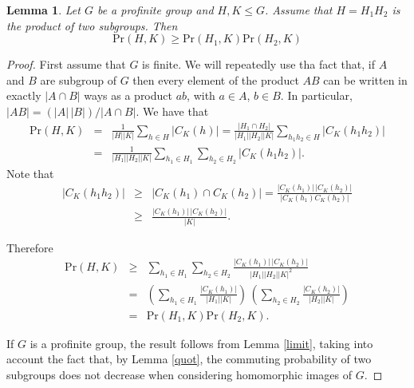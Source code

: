 \documentclass[12pt]{amsart}
\newtheorem{lemma}[theorem]{\bf Lemma}
\newcommand{\pr }{\mathrm{Pr} }
\begin{document}
\begin{lemma}\label{prod} 
Let $G$ be a profinite group and $H, K \le G$. Assume that $H=H_1H_2$ is the product of two subgroups. Then
\[\pr(H,K)\ge\pr(H_1,K)\pr(H_2,K)\]
\end{lemma}
\begin{proof} First assume that $G$ is finite. We will repeatedly use tha fact that, if $A$ and $B$ are subgroup of $G$ then every element of the product $AB$ %
can be written in exactly $|A\cap B|$ ways as a product $ab$, with $a\in A$, $b\in B$. In particular, $|AB|= (|A|\,|B|)/|A\cap B|$. 
We have that
\begin{eqnarray*}
\pr(H,K)
&=&
\frac{1}{|H||K|}
\sum_{h\in H} |C_K(h)|
 = %
\frac{|H_1\cap H_2|}{|H_1||H_2||K|}\sum_{h_1h_2\in H} |C_K(h_1h_2)|\\
&=&
\frac{1}{|H_1||H_2||K|}\sum_{h_1\in H_1}\sum_{h_2\in H_2}
|C_K(h_1h_2)|.
\end{eqnarray*}
 Note that 
 \begin{eqnarray*}
|C_K(h_1h_2)| &\ge& |C_K(h_1)\cap C_K(h_2)|=\frac{|C_K(h_1)|\,|C_K(h_2)|}{|C_K(h_1)C_K(h_2)|} \\
&\ge& \frac{|C_K(h_1)|\,|C_K(h_2)|}{|K|}.
\end{eqnarray*}

Therefore 
 \begin{eqnarray*}
\pr(H,K) &\ge &\sum_{h_1\in H_1}\sum_{h_2\in H_2}\frac{|C_K(h_1)|\,|C_K(h_2)|}{|H_1||H_2||K|^2}\\
 &=& \left(\sum_{h_1\in H_1}\frac{|C_K(h_1)|}{|H_1||K|}\right)\,\left(\sum_{h_2\in H_2}\frac{|C_K(h_2)|}{|H_2||K|}\right) \\
 &=& \pr(H_1,K)\pr(H_2,K).
\end{eqnarray*}

If $G$ is a profinite group, the result follows from Lemma \ref{limit}, taking into account the fact that, by Lemma \ref{quot}, the commuting 
probability of two subgroups does not decrease when considering homomorphic images of $G$.
\end{proof}
\end{document}
